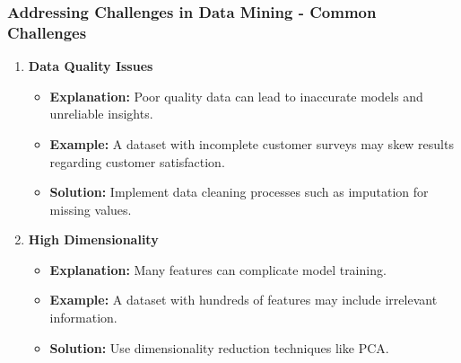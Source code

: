 \documentclass{beamer}
\begin{document}
\begin{frame}[fragile]
    \frametitle{Addressing Challenges in Data Mining - Common Challenges}
    \begin{enumerate}
        \item \textbf{Data Quality Issues}
        \begin{itemize}
            \item \textbf{Explanation:} Poor quality data can lead to inaccurate models and unreliable insights.
            \item \textbf{Example:} A dataset with incomplete customer surveys may skew results regarding customer satisfaction.
            \item \textbf{Solution:} Implement data cleaning processes such as imputation for missing values.
        \end{itemize}
        
        \item \textbf{High Dimensionality}
        \begin{itemize}
            \item \textbf{Explanation:} Many features can complicate model training.
            \item \textbf{Example:} A dataset with hundreds of features may include irrelevant information.
            \item \textbf{Solution:} Use dimensionality reduction techniques like PCA.
        \end{itemize}
    \end{enumerate}
\end{frame}
\end{document}
